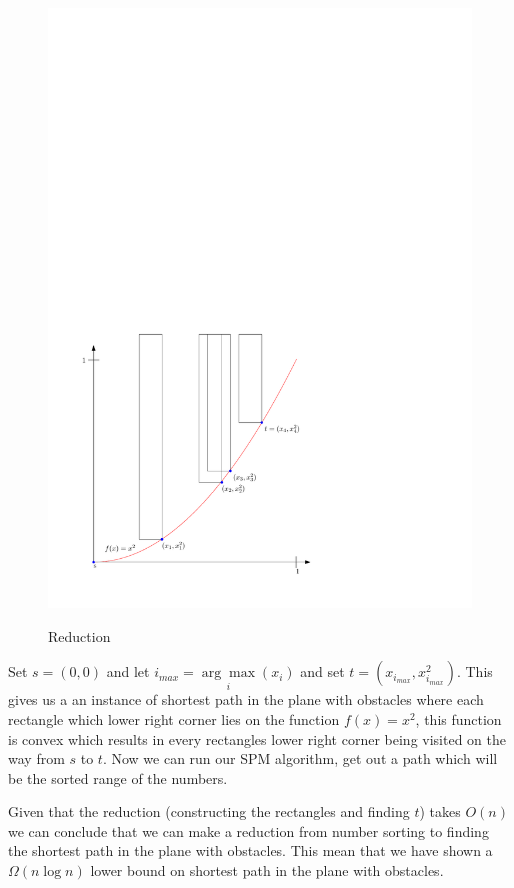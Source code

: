 \begin{figure}[H]
	\caption{Reduction}
	\includegraphics{figures/reduction.pdf}
	\label{fig:reduction}
\end{figure}

Set $s=(0,0)$ and let
$i_{max}=\underset{i}{\arg\max}(x_i)$ and set $t=(x_{i_{max}},x_{i_{max}}^2)$.
This gives us a an instance of shortest path in the plane with obstacles where
each rectangle which lower right corner lies on the
function $f(x)=x^2$, this function is convex which results in every rectangles
lower right corner being visited on the way from $s$ to $t$. Now we can run our
SPM algorithm, get out a path which will be the sorted range of the numbers.

Given that the reduction (constructing the rectangles and finding $t$) takes
$O(n)$ we can conclude that we can make a reduction from number sorting to
finding the shortest path in the plane with obstacles. This mean that we have
shown a $\Omega{(n\log n)}$ lower bound on shortest path in the plane with obstacles.
